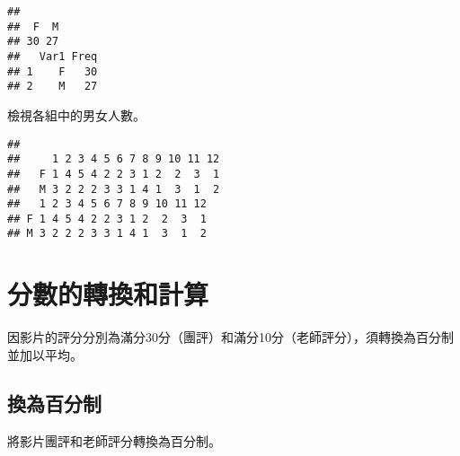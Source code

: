 \documentclass[
]{book}
\newenvironment{Shaded}{\begin{snugshade}}{\end{snugshade}}
\newcommand{\DecValTok}[1]{\textcolor[rgb]{0.00,0.00,0.81}{#1}}
\newcommand{\FunctionTok}[1]{\textcolor[rgb]{0.00,0.00,0.00}{#1}}
\newcommand{\NormalTok}[1]{#1}
\newcommand{\OtherTok}[1]{\textcolor[rgb]{0.56,0.35,0.01}{#1}}
\newcommand{\SpecialCharTok}[1]{\textcolor[rgb]{0.00,0.00,0.00}{#1}}
\begin{document}
\begin{verbatim}
## 
##  F  M 
## 30 27 
##   Var1 Freq
## 1    F   30
## 2    M   27
\end{verbatim}

檢視各組中的男女人數。

\begin{Shaded}
\end{Shaded}

\begin{verbatim}
##    
##     1 2 3 4 5 6 7 8 9 10 11 12
##   F 1 4 5 4 2 2 3 1 2  2  3  1
##   M 3 2 2 2 3 3 1 4 1  3  1  2
##   1 2 3 4 5 6 7 8 9 10 11 12
## F 1 4 5 4 2 2 3 1 2  2  3  1
## M 3 2 2 2 3 3 1 4 1  3  1  2
\end{verbatim}

\hypertarget{ux5206ux6578ux7684ux8f49ux63dbux548cux8a08ux7b97}{%
\section{分數的轉換和計算}\label{ux5206ux6578ux7684ux8f49ux63dbux548cux8a08ux7b97}}

因影片的評分分別為滿分30分（團評）和滿分10分（老師評分），須轉換為百分制並加以平均。

\hypertarget{ux63dbux70baux767eux5206ux5236}{%
\subsection{換為百分制}\label{ux63dbux70baux767eux5206ux5236}}

將影片團評和老師評分轉換為百分制。

\begin{Shaded}
\end{Shaded}
\end{document}
